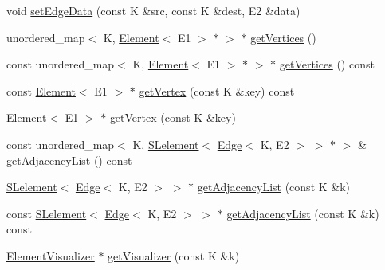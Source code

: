 \begin{DoxyCompactItemize}
void \mbox{\hyperlink{classbridges_1_1datastructure_1_1_graph_adj_list_a21a7e957d60e18b540dc778b1d569372}{set\+Edge\+Data}} (const K \&src, const K \&dest, E2 \&data)
\item 
unordered\+\_\+map$<$ K, \mbox{\hyperlink{classbridges_1_1datastructure_1_1_element}{Element}}$<$ E1 $>$ $\ast$ $>$ $\ast$ \mbox{\hyperlink{classbridges_1_1datastructure_1_1_graph_adj_list_af91334de325f4be241c3c939ea9c5a36}{get\+Vertices}} ()
\item 
const unordered\+\_\+map$<$ K, \mbox{\hyperlink{classbridges_1_1datastructure_1_1_element}{Element}}$<$ E1 $>$ $\ast$ $>$ $\ast$ \mbox{\hyperlink{classbridges_1_1datastructure_1_1_graph_adj_list_a77b21cfdb87c4cf45ce29be6e7dd9791}{get\+Vertices}} () const
\item 
const \mbox{\hyperlink{classbridges_1_1datastructure_1_1_element}{Element}}$<$ E1 $>$ $\ast$ \mbox{\hyperlink{classbridges_1_1datastructure_1_1_graph_adj_list_ada58af550495cee2fe454c0be0f8504e}{get\+Vertex}} (const K \&key) const
\item 
\mbox{\hyperlink{classbridges_1_1datastructure_1_1_element}{Element}}$<$ E1 $>$ $\ast$ \mbox{\hyperlink{classbridges_1_1datastructure_1_1_graph_adj_list_aa55482a035e233299d49874732113e6d}{get\+Vertex}} (const K \&key)
\item 
const unordered\+\_\+map$<$ K, \mbox{\hyperlink{classbridges_1_1datastructure_1_1_s_lelement}{S\+Lelement}}$<$ \mbox{\hyperlink{classbridges_1_1datastructure_1_1_edge}{Edge}}$<$ K, E2 $>$ $>$ $\ast$ $>$ \& \mbox{\hyperlink{classbridges_1_1datastructure_1_1_graph_adj_list_a23dad50371f073dd9a2f48e83720e86c}{get\+Adjacency\+List}} () const
\item 
\mbox{\hyperlink{classbridges_1_1datastructure_1_1_s_lelement}{S\+Lelement}}$<$ \mbox{\hyperlink{classbridges_1_1datastructure_1_1_edge}{Edge}}$<$ K, E2 $>$ $>$ $\ast$ \mbox{\hyperlink{classbridges_1_1datastructure_1_1_graph_adj_list_aa3df7d161ed7847a188b5818f78818d8}{get\+Adjacency\+List}} (const K \&k)
\item 
const \mbox{\hyperlink{classbridges_1_1datastructure_1_1_s_lelement}{S\+Lelement}}$<$ \mbox{\hyperlink{classbridges_1_1datastructure_1_1_edge}{Edge}}$<$ K, E2 $>$ $>$ $\ast$ \mbox{\hyperlink{classbridges_1_1datastructure_1_1_graph_adj_list_a1f8ea98a84017aa4bf6058475c0b3ed0}{get\+Adjacency\+List}} (const K \&k) const
\item 
\mbox{\hyperlink{classbridges_1_1datastructure_1_1_element_visualizer}{Element\+Visualizer}} $\ast$ \mbox{\hyperlink{classbridges_1_1datastructure_1_1_graph_adj_list_a097e4678b1273c29b1ac63319b4535e5}{get\+Visualizer}} (const K \&k)

\end{DoxyCompactItemize}
